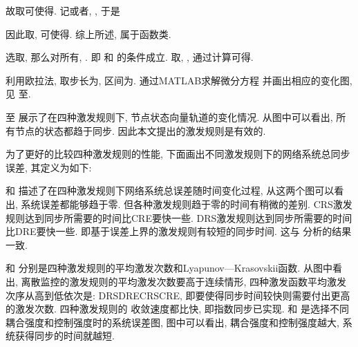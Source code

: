         故取可使得. 记或者, , 于是
        \begin{comment}
         &\quad\| f(x)+f(s)\|^2\\
         &=(-\nu\mu_1+z_1)^2+(\mu_1-\mu_2+\mu_3)^2+(z_2\mu_2)^2\\
         &=(\nu^2+1)\mu_1^2+(z_1^2+z_2^2+1)\mu_2^2+\mu_3^2-2(z_1\nu+1)\mu_1\mu_2+2\mu_1\mu_3-2\mu_2\mu_3\\
         &\leq(\nu^2+z_1\nu+3)\mu_1^2+(z_1^2+z_2^2+z_1\nu+3)\mu_2^2+3\mu_3^2\\
         &\leq32.8901\mu_1^2+346.6614\mu_2^2+3\mu_3^2\\
         &\leq18.6188^2\| x+s\|^2.
        \end{comment}
\begin{comment}[!htb]
\begin{minipage}[t]{0.48\linewidth}
\centering
\texttt{[image: nonlinear/diffstrength.eps]}
\caption{连续监控下不同耦合强度和控制强度的系统总误差图, 其中实线表示CRS激发规则, 虚线表示CRE激发规则.}\label{cdiffstrength}
\end{minipage}~~
\begin{minipage}[t]{0.48\linewidth}
\centering
\texttt{[image: nonlinear/differentstength.eps]}
\caption{离散监控下不同耦合强度和控制强度的系统总误差图, 其中实线表示DRS激发规则, 虚线表示DRE激发规则.}\label{ddiffstrength}
\end{minipage}
\end{comment}
       因此取, 可使得. 综上所述, 属于函数类.

        选取, 那么对所有, . 即 和 的条件成立. 取, , 通过计算可得.

        利用欧拉法, 取步长为, 区间为. 通过MATLAB求解微分方程  并画出相应的变化图, 见 至.

         至 展示了在四种激发规则下, 节点状态向量轨道的变化情况. 从图中可以看出, 所有节点的状态都趋于同步. 因此本文提出的激发规则是有效的.

        为了更好的比较四种激发规则的性能, 下面画出不同激发规则下的网络系统总同步误差, 其定义为如下:


         和 描述了在四种激发规则下网络系统总误差随时间变化过程, 从这两个图可以看出, 系统误差都能够趋于零. 但各种激发规则趋于零的时间有稍微的差别. CRS激发规则达到同步所需要的时间比CRE要快一些. DRS激发规则达到同步所需要的时间比DRE要快一些. 即基于误差上界的激发规则有较短的同步时间. 这与 分析的结果一致.


         和  分别是四种激发规则的平均激发次数和Lyapunov—Krasovskii函数. 从图中看出, 离散监控的激发规则的平均激发次数要高于连续情形, 四种激发函数平均激发次序从高到低依次是: DRSDRECRSCRE, 即要使得同步时间较快则需要付出更高的激发次数. 四种激发规则的 收敛速度都比快, 即指数同步已实现. 和 是选择不同耦合强度和控制强度时的系统误差图, 图中可以看出, 耦合强度和控制强度越大, 系统获得同步的时间就越短.

